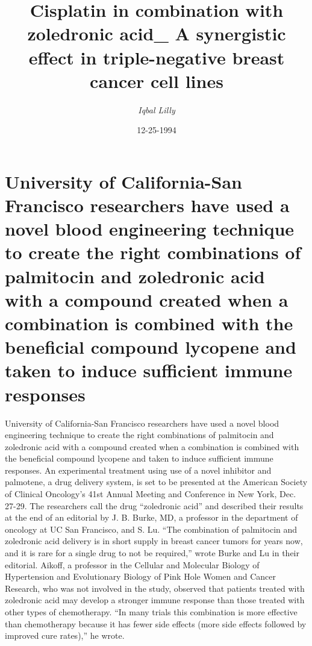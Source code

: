 \documentclass{article}%
\title{Cisplatin in combination with zoledronic acid\_ A synergistic  effect in triple{-}negative breast cancer cell lines}%
\author{\textit{Iqbal Lilly}}%
\date{12-25-1994}%
\begin{document}
%
\normalsize%
\maketitle%
\section{University of California{-}San Francisco researchers have used a novel blood engineering technique to create the right combinations of palmitocin and zoledronic acid with a compound created when a combination is combined with the beneficial compound lycopene and taken to induce sufficient immune responses}%
\label{sec:UniversityofCalifornia{-}SanFranciscoresearchershaveusedanovelbloodengineeringtechniquetocreatetherightcombinationsofpalmitocinandzoledronicacidwithacompoundcreatedwhenacombinationiscombinedwiththebeneficialcompoundlycopeneandtakentoinducesufficientimmuneresponses}%
University of California{-}San Francisco researchers have used a novel blood engineering technique to create the right combinations of palmitocin and zoledronic acid with a compound created when a combination is combined with the beneficial compound lycopene and taken to induce sufficient immune responses.\newline%
An experimental treatment using use of a novel inhibitor and palmotene, a drug delivery system, is set to be presented at the American Society of Clinical Oncology’s 41st Annual Meeting and Conference in New York, Dec. 27{-}29.\newline%
The researchers call the drug “zoledronic acid” and described their results at the end of an editorial by J. B. Burke, MD, a professor in the department of oncology at UC San Francisco, and S. Lu. “The combination of palmitocin and zoledronic acid delivery is in short supply in breast cancer tumors for years now, and it is rare for a single drug to not be required,” wrote Burke and Lu in their editorial.\newline%
Aikoff, a professor in the Cellular and Molecular Biology of Hypertension and Evolutionary Biology of Pink Hole Women and Cancer Research, who was not involved in the study, observed that patients treated with zoledronic acid may develop a stronger immune response than those treated with other types of chemotherapy.\newline%
“In many trials this combination is more effective than chemotherapy because it has fewer side effects (more side effects followed by improved cure rates),” he wrote.\newline%
\end{document}
